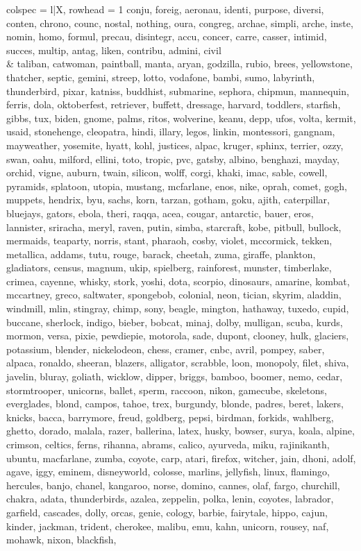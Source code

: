\begin{tblr}[
  long,
  caption = {Examples from SNLI.},
  entry = {Short Caption},
  label = {tblr:test},
]{
colspec = {l|X},
rowhead = 1}
conju, foreig, aeronau, identi, purpose, diversi, conten, chrono, counc, nostal, nothing, oura, congreg, archae, simpli, arche, inste, nomin, homo, formul, precau, disintegr, accu, concer, carre, casser, intimid, succes, multip, antag, liken, contribu, admini, civil \\ & taliban, catwoman, paintball, manta, aryan, godzilla, rubio, brees, yellowstone, thatcher, septic, gemini, streep, lotto, vodafone, bambi, sumo, labyrinth, thunderbird, pixar, katniss, buddhist, submarine, sephora, chipmun, mannequin, ferris, dola, oktoberfest, retriever, buffett, dressage, harvard, toddlers, starfish, gibbs, tux, biden, gnome, palms, ritos, wolverine, keanu, depp, ufos, volta, kermit, usaid, stonehenge, cleopatra, hindi, illary, legos, linkin, montessori, gangnam, mayweather, yosemite, hyatt, kohl, justices, alpac, kruger, sphinx, terrier, ozzy, swan, oahu, milford, ellini, toto, tropic, pvc, gatsby, albino, benghazi, mayday, orchid, vigne, auburn, twain, silicon, wolff, corgi, khaki, imac, sable, cowell, pyramids, splatoon, utopia, mustang, mcfarlane, enos, nike, oprah, comet, gogh, muppets, hendrix, byu, sachs, korn, tarzan, gotham, goku, ajith, caterpillar, bluejays, gators, ebola, theri, raqqa, acea, cougar, antarctic, bauer, eros, lannister, sriracha, meryl, raven, putin, simba, starcraft, kobe, pitbull, bullock, mermaids, teaparty, norris, stant, pharaoh, cosby, violet, mccormick, tekken, metallica, addams, tutu, rouge, barack, cheetah, zuma, giraffe, plankton, gladiators, census, magnum, ukip, spielberg, rainforest, munster, timberlake, crimea, cayenne, whisky, stork, yoshi, dota, scorpio, dinosaurs, amarine, kombat, mccartney, greco, saltwater, spongebob, colonial, neon, tician, skyrim, aladdin, windmill, mlin, stingray, chimp, sony, beagle, mington, hathaway, tuxedo, cupid, buccane, sherlock, indigo, bieber, bobcat, minaj, dolby, mulligan, scuba, kurds, mormon, versa, pixie, pewdiepie, motorola, sade, dupont, clooney, hulk, glaciers, potassium, blender, nickelodeon, chess, cramer, cnbc, avril, pompey, saber, alpaca, ronaldo, sheeran, blazers, alligator, scrabble, loon, monopoly, filet, shiva, javelin, bluray, goliath, wicklow, dipper, briggs, bamboo, boomer, nemo, cedar, stormtrooper, unicorns, ballet, sperm, raccoon, nikon, gamecube, skeletons, everglades, blond, campos, tahoe, trex, burgundy, blonde, padres, beret, lakers, knicks, bacca, barrymore, freud, goldberg, pepsi, birdman, forkids, wahlberg, ghetto, dorado, malala, razer, ballerina, latex, husky, bowser, surya, koala, alpine, crimson, celtics, ferns, rihanna, abrams, calico, ayurveda, miku, rajinikanth, ubuntu, macfarlane, zumba, coyote, carp, atari, firefox, witcher, jain, dhoni, adolf, agave, iggy, eminem, disneyworld, colosse, marlins, jellyfish, linux, flamingo, hercules, banjo, chanel, kangaroo, norse, domino, cannes, olaf, fargo, churchill, chakra, adata, thunderbirds, azalea, zeppelin, polka, lenin, coyotes, labrador, garfield, cascades, dolly, orcas, genie, cology, barbie, fairytale, hippo, cajun, kinder, jackman, trident, cherokee, malibu, emu, kahn, unicorn, rousey, naf, mohawk, nixon, blackfish, 
\end{tblr}
